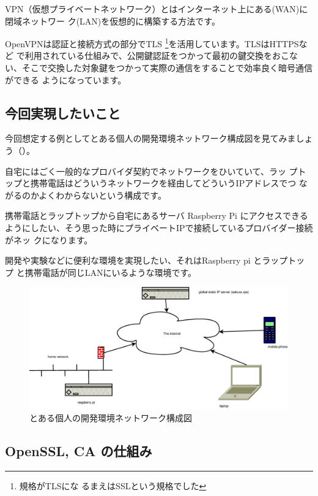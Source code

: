 \documentclass[mingoth,a4paper]{jsarticle}
\begin{document}
VPN（仮想プライベートネットワーク）とはインターネット上にある(WAN)に閉域ネットワー
ク(LAN)を仮想的に構築する方法です。

OpenVPNは認証と接続方式の部分でTLS\cite{rfc5246} \footnote{規格がTLSにな
るまえはSSLという規格でした}を活用しています。TLSはHTTPSなど
で利用されている仕組みで、公開鍵認証をつかって最初の鍵交換をおこな
い、そこで交換した対象鍵をつかって実際の通信をすることで効率良く暗号通信ができる
ようになっています。

\subsection{今回実現したいこと}

今回想定する例としてとある個人の開発環境ネットワーク構成図を見てみましょ
う（）。

自宅にはごく一般的なプロバイダ契約でネットワークをひいていて、ラッ
プトップと携帯電話はどういうネットワークを経由してどういうIPアドレスでつ
ながるのかよくわからないという構成です。

携帯電話とラップトップから自宅にあるサーバ Raspberry Pi にアクセスできる
ようにしたい、そう思った時にプライベートIPで接続しているプロバイダー接続がネッ
クになります。

開発や実験などに便利な環境を実現したい、それはRaspberry pi とラップトップ
と携帯電話が同じLANにいるような環境です。

\begin{figure}[H]
\begin{center}
  \includegraphics[width=0.8\hsize]{image201308/network.eps}
 \caption{とある個人の開発環境ネットワーク構成図}
 \label{fig:network}
\end{center}
\end{figure}

\subsection{OpenSSL, CA の仕組み}
\end{document}

